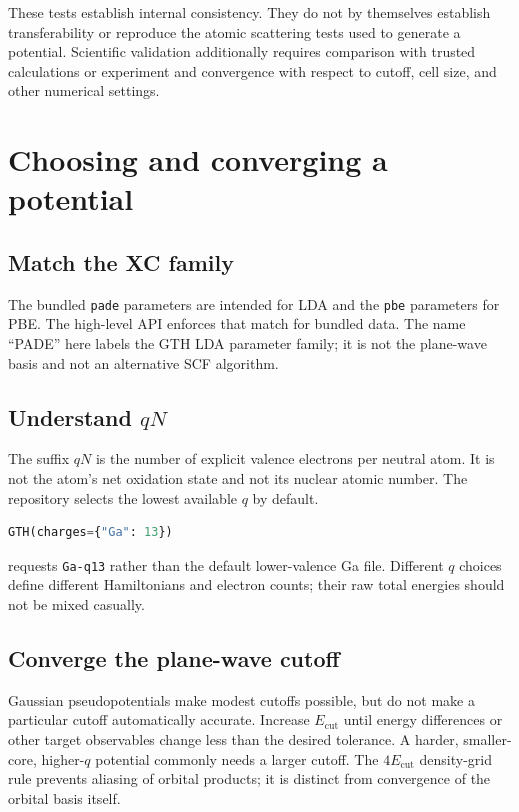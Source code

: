 \documentclass[10pt,twocolumn]{article}
\newcommand{\code}[1]{\texttt{#1}}
\begin{document}
These tests establish internal consistency.  They do not by themselves
establish transferability or reproduce the atomic scattering tests used to
generate a potential.  Scientific validation additionally requires
comparison with trusted calculations or experiment and convergence with
respect to cutoff, cell size, and other numerical settings.

\section{Choosing and converging a potential}

\subsection{Match the XC family}

The bundled \code{pade} parameters are intended for LDA and the \code{pbe}
parameters for PBE.  The high-level API enforces that match for bundled data.
The name ``PADE'' here labels the GTH LDA parameter family; it is not the
plane-wave basis and not an alternative SCF algorithm.

\subsection{Understand \texorpdfstring{\(qN\)}{qN}}

The suffix \(qN\) is the number of explicit valence electrons per neutral
atom.  It is not the atom's net oxidation state and not its nuclear atomic
number.  The repository selects the lowest available \(q\) by default.
\begin{lstlisting}[language=Python]
GTH(charges={"Ga": 13})
\end{lstlisting}
requests \code{Ga-q13} rather than the default lower-valence Ga file.
Different \(q\) choices define different Hamiltonians and electron counts;
their raw total energies should not be mixed casually.

\subsection{Converge the plane-wave cutoff}

Gaussian pseudopotentials make modest cutoffs possible, but do not make a
particular cutoff automatically accurate.  Increase \(E_{\mathrm{cut}}\)
until energy differences or other target observables change less than the
desired tolerance.  A harder, smaller-core, higher-\(q\) potential commonly
needs a larger cutoff.  The \(4E_{\mathrm{cut}}\) density-grid rule prevents
aliasing of orbital products; it is distinct from convergence of the orbital
basis itself.
\end{document}
